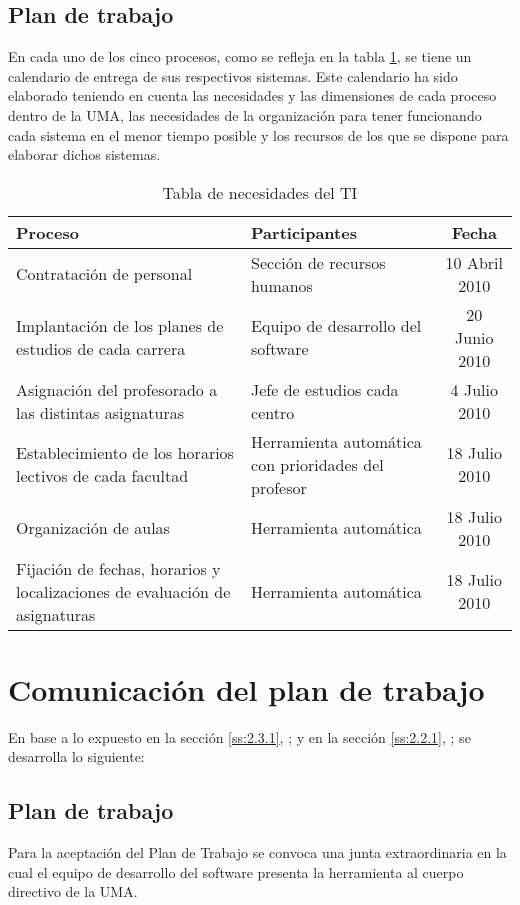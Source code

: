 \documentclass[11pt,a4paper,spanish,twoside]{report}
\begin{document}
\subsection{Plan de trabajo} \label{ss:2.3.1}
En cada uno de los cinco procesos, como se refleja en la tabla
\ref{Tab:NecTI}, se tiene un calendario de entrega de sus 
respectivos sistemas. Este calendario ha sido elaborado teniendo en cuenta
las necesidades y las dimensiones de cada proceso dentro de la UMA, las
necesidades de la organización para tener funcionando cada sistema en el menor
tiempo posible y los recursos de los que se dispone para elaborar dichos
sistemas. 

\begin{table}[!h]
\centering
  \begin{tabular}{p{4cm}p{5cm}c}
    \textbf{Proceso} & \textbf{Participantes} & \textbf{Fecha} \\
    \hline \hline
    Contratación de personal & Sección de recursos humanos & 10 Abril 2010\\ 
    \hline
    Implantación de los planes de estudios de cada carrera & Equipo de
    desarrollo del software & 20 Junio 2010\\
    \hline
    Asignación del profesorado a las distintas asignaturas & Jefe de estudios
    cada centro  & 4 Julio 2010\\
    \hline
    Establecimiento de los horarios lectivos de cada facultad & Herramienta
    automática con prioridades del profesor & 18 Julio 2010\\
    \hline
    Organización de aulas & Herramienta automática & 18 Julio 2010\\
    \hline
    Fijación de fechas, horarios y localizaciones de evaluación de
    asignaturas & Herramienta automática & 18 Julio 2010\\
    \hline
  \end{tabular}
  \caption{Tabla de necesidades del TI} \label{Tab:NecTI}
\end{table}

\section{Comunicación del plan de trabajo}
En base a lo expuesto en la sección \vref{ss:2.3.1},
\emph{}; y en la sección \vref{ss:2.2.1},
\emph{}; se desarrolla lo siguiente:

\subsection{Plan de trabajo}
Para la aceptación del Plan de Trabajo se convoca una junta extraordinaria en
la cual el equipo de desarrollo del software presenta la herramienta al
cuerpo directivo de la UMA.
\end{document}
